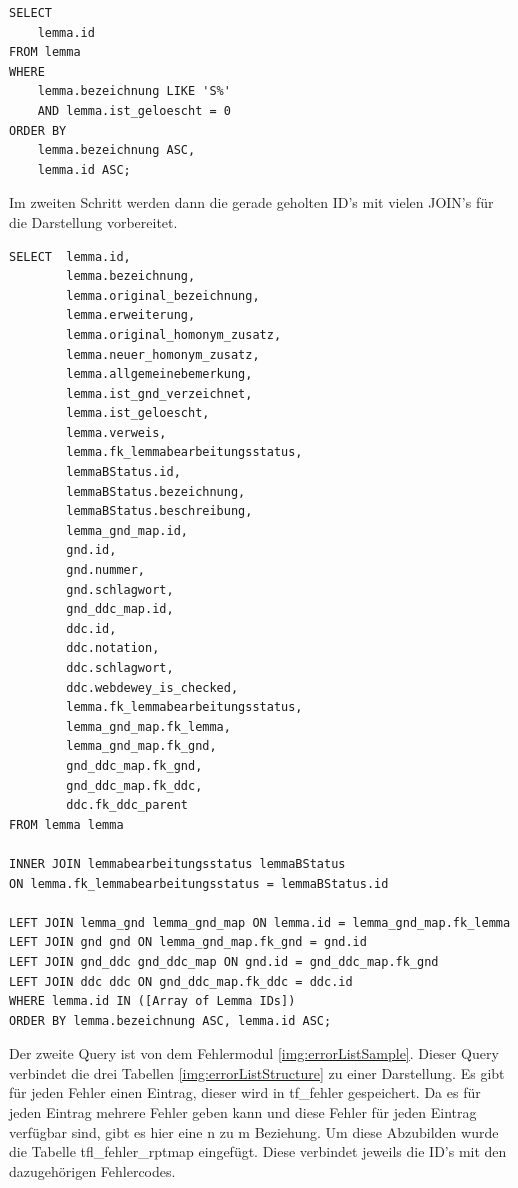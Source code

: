 \lstset{language=SQL}
\begin{lstlisting}[frame=single] 
    SELECT
    lemma.id
FROM lemma
WHERE
    lemma.bezeichnung LIKE 'S%'
    AND lemma.ist_geloescht = 0
ORDER BY
    lemma.bezeichnung ASC,
    lemma.id ASC;
\end{lstlisting}

Im zweiten Schritt werden dann die gerade geholten ID’s mit vielen JOIN’s für die Darstellung vorbereitet.

\lstset{language=SQL}
\begin{lstlisting}[frame=single] 
SELECT  lemma.id,                        
        lemma.bezeichnung,                
        lemma.original_bezeichnung,     
        lemma.erweiterung,               
        lemma.original_homonym_zusatz,  
        lemma.neuer_homonym_zusatz,      
        lemma.allgemeinebemerkung,       
        lemma.ist_gnd_verzeichnet,      
        lemma.ist_geloescht,             
        lemma.verweis,                  
        lemma.fk_lemmabearbeitungsstatus, 
        lemmaBStatus.id,               
        lemmaBStatus.bezeichnung,    
        lemmaBStatus.beschreibung,              
        lemma_gnd_map.id,                 
        gnd.id,               
        gnd.nummer,                   
        gnd.schlagwort,             
        gnd_ddc_map.id,              
        ddc.id,                      
        ddc.notation,               
        ddc.schlagwort,             
        ddc.webdewey_is_checked,        
        lemma.fk_lemmabearbeitungsstatus,
        lemma_gnd_map.fk_lemma,
        lemma_gnd_map.fk_gnd,          
        gnd_ddc_map.fk_gnd,         
        gnd_ddc_map.fk_ddc,                
        ddc.fk_ddc_parent            
FROM lemma lemma
      
INNER JOIN lemmabearbeitungsstatus lemmaBStatus
ON lemma.fk_lemmabearbeitungsstatus = lemmaBStatus.id

LEFT JOIN lemma_gnd lemma_gnd_map ON lemma.id = lemma_gnd_map.fk_lemma
LEFT JOIN gnd gnd ON lemma_gnd_map.fk_gnd = gnd.id
LEFT JOIN gnd_ddc gnd_ddc_map ON gnd.id = gnd_ddc_map.fk_gnd
LEFT JOIN ddc ddc ON gnd_ddc_map.fk_ddc = ddc.id
WHERE lemma.id IN ([Array of Lemma IDs])
ORDER BY lemma.bezeichnung ASC, lemma.id ASC;

\end{lstlisting}

Der zweite Query ist von dem Fehlermodul \ref{img:errorListSample}. Dieser Query verbindet die drei Tabellen \ref{img:errorListStructure} zu einer Darstellung. Es gibt für jeden Fehler einen Eintrag, dieser wird in tf\_fehler gespeichert. Da es für jeden Eintrag mehrere Fehler geben kann und diese Fehler für jeden Eintrag verfügbar sind, gibt es hier eine n zu m Beziehung. Um diese Abzubilden wurde die Tabelle tfl\_fehler\_rptmap eingefügt. Diese verbindet jeweils die ID’s mit den dazugehörigen Fehlercodes. 

